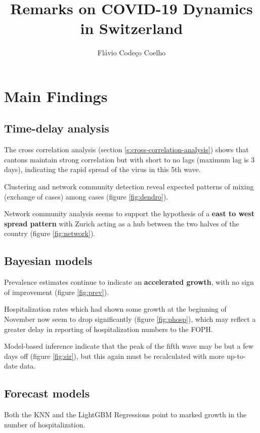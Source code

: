 \documentclass[11pt]{article}
\title{Remarks on COVID-19 Dynamics in Switzerland}
\author{Flávio Codeço Coelho}
\begin{document}
    
    \maketitle
    
    
\tableofcontents

\listoffigures

\section{Main Findings}
\subsection{Time-delay analysis}
The cross correlation analysis (section \ref{s:cross-correlation-analysis}) shows that cantons maintain strong correlation but with short to no lags (maximum lag is 3 days), indicating the rapid spread of the virus in this 5th wave. 

Clustering and network community detection reveal expected patterns of mixing (exchange of cases) among cases (figure \ref{fig:dendro}).

Network community analysis seems to support the hypothesis of a \textbf{east to west spread pattern} with Zurich acting as a hub between the two halves of the country (figure \ref{fig:network}).

\subsection{Bayesian models}

Prevalence estimates continue to indicate an \textbf{accelerated growth}, with no sign of improvement (figure \ref{fig:prev}). 

Hospitalization rates which had shown some growth at the beginning of November now seem to drop significantly (figure \ref{fig:phosp}), which may reflect a greater delay in reporting of hospitalization numbers to the FOPH.

Model-based inference indicate that the peak of the fifth wave may be but a few days off (figure \ref{fig:sir}), but this again must be recalculated with more up-to-date data.

\subsection{Forecast models}
Both the KNN and the LightGBM Regressions point to marked growth in the number of hospitalization.
\end{document}
